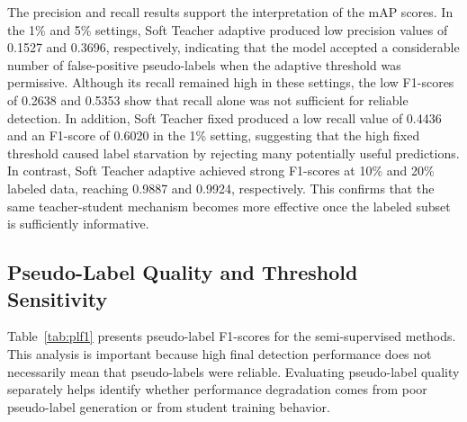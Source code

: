 \documentclass[conference,a4paper]{IEEEtran}
\begin{document}
The precision and recall results support the interpretation of the mAP scores. In the 1\% and 5\% settings, Soft Teacher adaptive produced low precision values of 0.1527 and 0.3696, respectively, indicating that the model accepted a considerable number of false-positive pseudo-labels when the adaptive threshold was permissive. Although its recall remained high in these settings, the low F1-scores of 0.2638 and 0.5353 show that recall alone was not sufficient for reliable detection. In addition, Soft Teacher fixed produced a low recall value of 0.4436 and an F1-score of 0.6020 in the 1\% setting, suggesting that the high fixed threshold caused label starvation by rejecting many potentially useful predictions. In contrast, Soft Teacher adaptive achieved strong F1-scores at 10\% and 20\% labeled data, reaching 0.9887 and 0.9924, respectively. This confirms that the same teacher-student mechanism becomes more effective once the labeled subset is sufficiently informative.

\subsection{Pseudo-Label Quality and Threshold Sensitivity}
Table~\ref{tab:plf1} presents pseudo-label F1-scores for the semi-supervised methods. This analysis is important because high final detection performance does not necessarily mean that pseudo-labels were reliable. Evaluating pseudo-label quality separately helps identify whether performance degradation comes from poor pseudo-label generation or from student training behavior.

\begin{table}[!t]
\caption{Pseudo-label F1-score across labeled-data fractions.}
\label{tab:plf1}
\centering
{}
\end{table}
\end{document}
